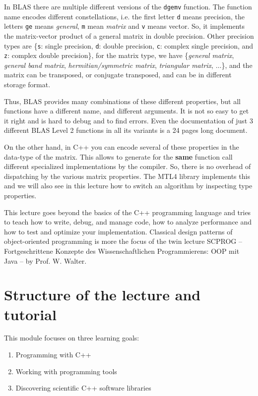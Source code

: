 \begin{rem}
  In BLAS there are multiple different versions of the \texttt{dgemv} function. The function name encodes different constellations, i.e.
  the first letter \texttt{d} means  precision, the letters \texttt{ge} means \emph{general}, \texttt{m} mean \emph{matrix}
  and \texttt{v} means vector. So, it implements the matrix-vector product of a general matrix in double precision. Other precision
  types are \{\texttt{s}: single precision, \texttt{d}: double precision, \texttt{c}: complex single precision, and \texttt{z}: complex
  double precision\}, for the matrix type, we have \{\emph{general matrix}, \emph{general band matrix}, \emph{hermitian/symmetric matrix},
  \emph{triangular matrix}, $\ldots$\}, and the matrix can be transposed, or conjugate transposed, and can be in different storage format.

  Thus, BLAS provides many combinations of these different properties, but all functions have a different name, and different arguments. It
  is not so easy to get it right and is hard to debug and to find errors. Even the documentation of just 3 different BLAS Level 2 functions
  in all its variants is a 24 pages long document.

  On the other hand, in C++ you can encode several of these properties in the data-type of the matrix. This allows to generate for the \textbf{same}
  function call different specialized implementations by the compiler. So, there is no overhead of dispatching by the various matrix properties.
  The MTL4 library implements this and we will also see in this lecture how to switch an algorithm by inspecting type properties.
\end{rem}

This lecture goes beyond the basics of the C++ programming language and tries to teach how to write, debug, and manage code, how to analyze
performance and how to test and optimize your implementation. Classical design patterns of object-oriented programming is more the focus of
the twin lecture SCPROG -- Fortgeschrittene Konzepte des Wissenschaftlichen Programmierens: OOP mit Java -- by Prof. W. Walter.


\section{Structure of the lecture and tutorial}
This module focuses on three learning goals:
\begin{enumerate}[1)]
  \item Programming with C++
  \item Working with programming tools
  \item Discovering scientific C++ software libraries
\end{enumerate}

